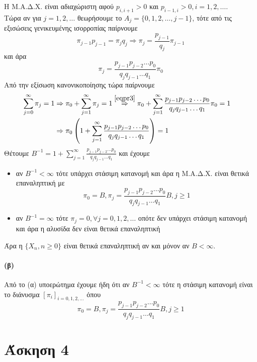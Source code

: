 \documentclass[a4paper,11pt]{article}
\begin{document}
Η Μ.Α.Δ.Χ. είναι αδιαχώριστη αφού $p_{i,i+1} > 0$ και $p_{i-1,i} > 0, i = 1,2,\dots$.
\\[8pt]
Τώρα αν για $j=1,2,\dots$ θεωρήσουμε το $A_j = \{0,1,2,\dots,j-1\}$, τότε από τις εξισώσεις γενικευμένης ισορροπίας παίρνουμε
\[
	\pi_{j-1} p_{j-1} = \pi_j q_j \Rightarrow \pi_j = \frac{p_{j-1}}{q_j} \pi_{j-1}
\]
και άρα
\begin{equation}
	\pi_j = \frac{p_{j-1} p_{j-2} \dots p_0}{q_j q_{j-1} \dots q_1} \pi_0 \label{eqpr3}
\end{equation}
Από την εξίσωση κανονικοποίησης τώρα παίρνουμε
\begin{align*}
	\sum_{j=0}^\infty \pi_j = 1 &\Rightarrow \pi_0 + \sum_{j=1}^\infty \pi_j = 1
		\stackrel{\eqref{eqpr3}}{\Rightarrow} \pi_0 + \sum_{j=1}^\infty \frac{p_{j-1} p_{j-2} \dots p_0}{q_j q_{j-1} \dots q_1} \pi_0 = 1 &\\
		&\Rightarrow \pi_0 \left(1 + \sum_{j=1}^\infty \frac{p_{j-1} p_{j-2} \dots p_0}{q_j q_{j-1} \dots q_1} \right) = 1
\end{align*}
Θέτουμε $B^{-1} = 1 + \sum_{j=1}^\infty \frac{p_{j-1} p_{j-2} \dots p_0}{q_j q_{j-1} \dots q_1}$ και έχουμε
\begin{itemize}
	\item αν $B^{-1} < \infty$ τότε υπάρχει στάσιμη κατανομή και άρα η Μ.Α.Δ.Χ. είναι θετικά επαναληπτική με
		\[\pi_0=B, \pi_j = \frac{p_{j-1} p_{j-2} \dots p_0}{q_j q_{j-1} \dots q_1} B, j \geq 1\]
	\item αν $B^{-1} = \infty$ τότε $\pi_j = 0, \forall j = 0,1,2,\dots$ οπότε δεν υπάρχει στάσιμη κατανομή και άρα η αλυσίδα δεν είναι θετικά επαναληπτική
\end{itemize}
Άρα η $\{X_n,n\geq 0\}$ είναι θετικά επαναληπτική αν και μόνον αν $B < \infty$.

\paragraph{(β)}
Από το (α) υποερώτημα έχουμε ήδη ότι αν $B^{-1} < \infty$ τότε η στάσιμη κατανομή είναι το διάνυσμα $[\pi_i]_{i=0,1,2,\dots}$ όπου
\[\pi_0=B, \pi_j = \frac{p_{j-1} p_{j-2} \dots p_0}{q_j q_{j-1} \dots q_1} B, j \geq 1\]


\section*{Άσκηση 4}
\end{document}
